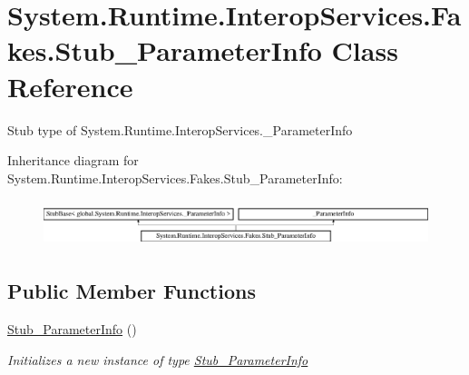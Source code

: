 \hypertarget{class_system_1_1_runtime_1_1_interop_services_1_1_fakes_1_1_stub___parameter_info}{\section{System.\-Runtime.\-Interop\-Services.\-Fakes.\-Stub\-\_\-\-Parameter\-Info Class Reference}
\label{class_system_1_1_runtime_1_1_interop_services_1_1_fakes_1_1_stub___parameter_info}
}


Stub type of System.\-Runtime.\-Interop\-Services.\-\_\-\-Parameter\-Info 


Inheritance diagram for System.\-Runtime.\-Interop\-Services.\-Fakes.\-Stub\-\_\-\-Parameter\-Info\-:\begin{figure}[H]
\begin{center}
\leavevmode
\includegraphics[height=1.379310cm]{class_system_1_1_runtime_1_1_interop_services_1_1_fakes_1_1_stub___parameter_info}
\end{center}
\end{figure}
\subsection*{Public Member Functions}
\begin{DoxyCompactItemize}
\item 
\hyperlink{class_system_1_1_runtime_1_1_interop_services_1_1_fakes_1_1_stub___parameter_info_a436d3a4f4443931d3e03ed5041abc6d2}{Stub\-\_\-\-Parameter\-Info} ()
\begin{DoxyCompactList}\small\item\em Initializes a new instance of type \hyperlink{class_system_1_1_runtime_1_1_interop_services_1_1_fakes_1_1_stub___parameter_info}{Stub\-\_\-\-Parameter\-Info}\end{DoxyCompactList}\end{DoxyCompactItemize}
